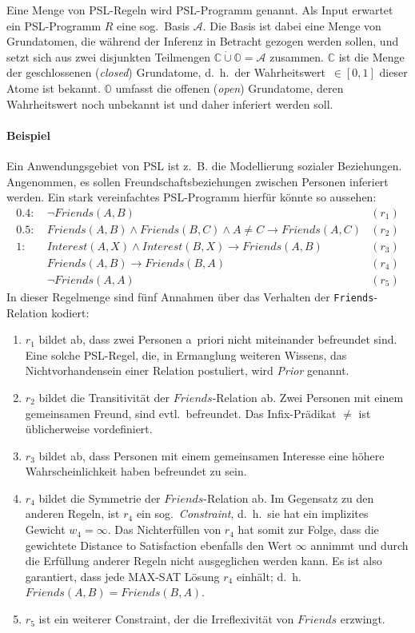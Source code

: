 Eine Menge von PSL-Regeln wird PSL-Programm genannt.
Als Input erwartet ein PSL-Programm $R$ eine sog.\ Basis $\mathcal{A}$.
Die Basis ist dabei eine Menge von Grundatomen, die während der Inferenz in Betracht gezogen werden sollen, und setzt sich aus zwei disjunkten Teilmengen $\mathbb{C} \mathbin{\dot\cup} \mathbb{O} = \mathcal{A}$ zusammen.
$\mathbb{C}$ ist die Menge der geschlossenen (\textit{closed}) Grundatome, d.~h.\ der Wahrheitswert~$\in [0, 1]$ dieser Atome ist bekannt.
$\mathbb{O}$ umfasst die offenen (\textit{open}) Grundatome, deren Wahrheitswert noch unbekannt ist und daher inferiert werden soll.

\paragraph{Beispiel}
Ein Anwendungsgebiet von PSL ist z.~B. die Modellierung sozialer Beziehungen.
Angenommen, es sollen Freundschaftsbeziehungen zwischen Personen inferiert werden.
Ein stark vereinfachtes PSL-Programm hierfür könnte so aussehen:
\begin{align*}
	0.4:&\ \lnot Friends(A, B) & (r_1) \\
	0.5:&\ Friends(A, B) \land Friends(B, C) \land A \neq C \rightarrow Friends(A, C) & (r_2) \\
	1:&\ Interest(A, X) \land Interest(B, X) \rightarrow Friends(A, B) & (r_3) \\
	&\ Friends(A, B) \rightarrow Friends(B, A) & (r_4) \\
	&\ \lnot Friends(A, A) & (r_5)
\end{align*}
In dieser Regelmenge sind fünf Annahmen über das Verhalten der \texttt{Friends}-Relation kodiert:
\begin{enumerate}
	\item $r_1$ bildet ab, dass zwei Personen a~priori nicht miteinander befreundet sind.
		Eine solche PSL-Regel, die, in Ermanglung weiteren Wissens, das Nichtvorhanden\-sein einer Relation postuliert, wird \textit{Prior} genannt.
	\item $r_2$ bildet die Transitivität der $Friends$-Relation ab.
		Zwei Personen mit einem gemeinsamen Freund, sind evtl.\ befreundet.
		Das Infix-Prädikat $\neq$ ist üblicherweise vordefiniert.
	\item $r_3$ bildet ab, dass Personen mit einem gemeinsamen Interesse eine höhere Wahrscheinlichkeit haben befreundet zu sein.
	\item $r_4$ bildet die Symmetrie der $Friends$-Relation ab.
		Im Gegensatz zu den anderen Regeln, ist $r_4$ ein sog.\ \textit{Constraint}, d.~h.\ sie hat ein implizites Gewicht $w_4 = \infty$.
		Das Nichterfüllen von $r_4$ hat somit zur Folge, dass die gewichtete Distance to Satisfaction ebenfalls den Wert $\infty$ annimmt und durch die Erfüllung anderer Regeln nicht ausgeglichen werden kann.
		Es ist also garantiert, dass jede MAX-SAT Lösung $r_4$ einhält;
		d.~h. $Friends(A, B) = Friends(B, A)$.
	\item $r_5$ ist ein weiterer Constraint, der die Irreflexivität von $Friends$ erzwingt.
\end{enumerate}

